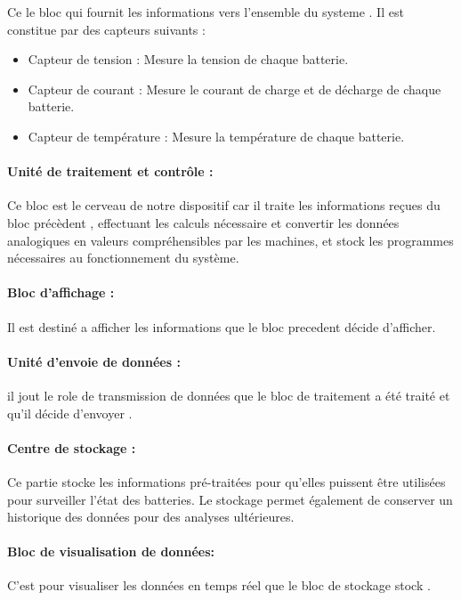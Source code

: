 Ce le bloc qui fournit les informations vers l'ensemble du systeme . Il est constitue par  des capteurs suivants :
\begin{itemize}
	\item Capteur de tension : Mesure la tension de chaque batterie.
	\item Capteur de courant : Mesure le courant de charge et de décharge de chaque batterie.
	\item	Capteur de température : Mesure la température de chaque batterie.
\end{itemize}

\paragraph{Unité de traitement et contrôle : }


Ce bloc est le cerveau de notre dispositif car il traite les informations reçues du bloc précèdent , effectuant les calculs nécessaire et convertir les données analogiques en valeurs compréhensibles par les machines, et stock les programmes nécessaires au fonctionnement du système.

\paragraph{Bloc d'affichage :}
Il est destiné a afficher les informations que le bloc precedent décide d'afficher. 

\paragraph{Unité d'envoie de données : }
il jout le role de transmission de données que le bloc de traitement a été traité et qu'il décide d'envoyer .

\paragraph{Centre de stockage  :}
Ce partie stocke les informations pré-traitées pour qu'elles puissent être utilisées pour surveiller l'état des batteries. Le stockage permet également de conserver un historique des données pour des analyses ultérieures.

\paragraph{Bloc de visualisation de données:}
C'est pour visualiser les données en temps réel que le bloc de stockage stock .

